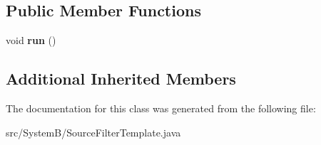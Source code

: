 \subsection*{Public Member Functions}
\begin{DoxyCompactItemize}
\item 
\hypertarget{class_system_b_1_1_source_filter_template_ad71ca9de522389b31d5c199d7d5ee73b}{}void {\bfseries run} ()\label{class_system_b_1_1_source_filter_template_ad71ca9de522389b31d5c199d7d5ee73b}

\end{DoxyCompactItemize}
\subsection*{Additional Inherited Members}


The documentation for this class was generated from the following file\+:\begin{DoxyCompactItemize}
\item 
src/\+System\+B/Source\+Filter\+Template.\+java\end{DoxyCompactItemize}
